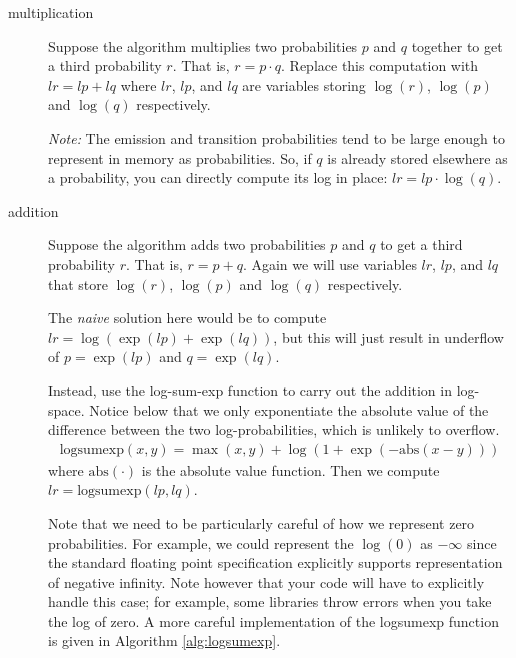 \documentclass{article}
\begin{document}
\begin{description}
\item[multiplication] Suppose the algorithm multiplies two probabilities $p$ and $q$ together to get a third probability $r$. That is, $r = p \cdot q$. Replace this computation with $lr = lp + lq$ where $lr$, $lp$, and $lq$ are variables storing $\log(r)$, $\log(p)$ and $\log(q)$ respectively.

\emph{Note:} The emission and transition probabilities tend to be large enough to represent in memory as probabilities. So, if $q$ is already stored elsewhere as a probability, you can directly compute its log in place: $lr = lp \cdot \log(q)$. 

\item[addition] Suppose the algorithm adds two probabilities $p$ and $q$ to get a third probability $r$. That is, $r = p + q$. Again we will use variables $lr$, $lp$, and $lq$ that store $\log(r)$, $\log(p)$ and $\log(q)$ respectively. 

The \emph{naive} solution here would be to compute $lr = \log(\exp(lp) + \exp(lq))$, but this will just result in underflow of $p = \exp(lp)$ and $q = \exp(lq)$.   

Instead, use the log-sum-exp function to carry out the addition in log-space. Notice below that we only exponentiate the absolute value of the difference between the two log-probabilities, which is unlikely to overflow. 
\begin{align}
    \text{logsumexp}(x,y) = \max(x,y) + \log(1 + \exp(-\text{abs}(x - y)))
\end{align}
where $\text{abs}(\cdot)$ is the absolute value function.
Then we compute $lr = \text{logsumexp}(lp, lq)$.

Note that we need to be particularly careful of how we represent zero probabilities. For example, we could represent the $\log(0)$ as $-\infty$ since the standard floating point specification explicitly supports representation of negative infinity. Note however that your code will have to explicitly handle this case; for example, some libraries throw errors when you take the log of zero. A more careful implementation of the logsumexp function is given in Algorithm \ref{alg:logsumexp}. 

\end{description}

\end{document}
